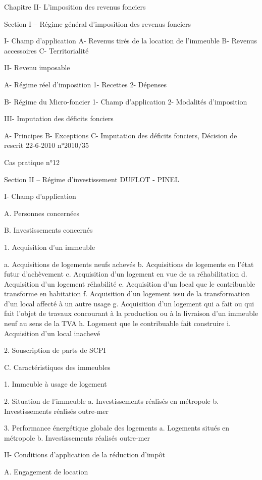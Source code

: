 Chapitre II- L’imposition des revenus fonciers

	Section I – Régime général d’imposition des revenus fonciers 

		I- Champ d'application
			A- Revenus tirés de la location de l’immeuble
			B- Revenus accessoires
			C- Territorialité

		II- Revenu imposable 

			A-  Régime réel d'imposition
				1- Recettes
				2- Dépenses

			B- Régime du Micro-foncier 
				1- Champ d'application
				2- Modalités d'imposition

		III- Imputation des déficits fonciers 
		
			A- Principes
			B- Exceptions 
			C- Imputation des déficits fonciers, Décision de rescrit 22-6-2010 				n°2010/35 

			Cas pratique n°12

	Section II – Régime d’investissement DUFLOT - PINEL

I- Champ d’application

A. Personnes concernées

B. Investissements concernés

1. Acquisition d'un immeuble

a. Acquisitions de logements neufs achevés
b. Acquisitions de logements en l'état futur d'achèvement
c. Acquisition d'un logement en vue de sa réhabilitation
d. Acquisition d'un logement réhabilité
e. Acquisition d'un local que le contribuable transforme en habitation
f. Acquisition d'un logement issu de la transformation d'un local affecté à un autre usage
g. Acquisition d'un logement qui a fait ou qui fait l'objet de travaux concourant à la production ou à la livraison d'un immeuble neuf au sens de la TVA
h. Logement que le contribuable fait construire
i. Acquisition d'un local inachevé

2. Souscription de parts de SCPI

C. Caractéristiques des immeubles

1. Immeuble à usage de logement

2. Situation de l'immeuble 
a. Investissements réalisés en métropole
b. Investissements réalisés outre-mer

3. Performance énergétique globale des logements
a. Logements situés en métropole
b. Investissements réalisés outre-mer


II- Conditions d’application de la réduction d’impôt

A. Engagement de location

